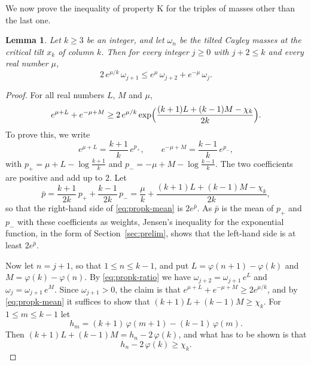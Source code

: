 \documentclass{amsart}
\newtheorem{lemma}[theorem]{Lemma}
\theoremstyle{definition}
\theoremstyle{remark}
\numberwithin{equation}{section}
\begin{document}
We now prove the inequality of property K for the triples of
masses other than the last one.

\begin{lemma}\label{lem:massesmiddle}
Let $k\ge3$ be an integer, and let $\omega_n$ be the tilted Cayley masses
at the critical tilt $x_k$ of column $k$. Then for every integer $j\ge0$
with $j+2\le k$ and every real number $\mu$,
\[
2\,e^{\mu/k}\,\omega_{j+1}\le e^{\mu}\,\omega_{j+2}+e^{-\mu}\,\omega_j .
\]
\end{lemma}

\begin{proof}
For all real numbers $L$, $M$ and $\mu$,
\begin{equation}\label{eq:propk-mean}
e^{\mu+L}+e^{-\mu+M}\ge
2\,e^{\mu/k}\exp\Bigl(\frac{(k+1)L+(k-1)M-\chi_k}{2k}\Bigr).
\end{equation}
To prove this, we write
\[
e^{\mu+L}=\frac{k+1}{k}\,e^{p_+},\qquad
e^{-\mu+M}=\frac{k-1}{k}\,e^{p_-},
\]
with $p_+=\mu+L-\log\frac{k+1}{k}$ and $p_-=-\mu+M-\log\frac{k-1}{k}$. The
two coefficients are positive and add up to $2$. Let
\[
\bar p=\frac{k+1}{2k}\,p_++\frac{k-1}{2k}\,p_-
=\frac{\mu}{k}+\frac{(k+1)L+(k-1)M-\chi_k}{2k} ,
\]
so that the right-hand side of \eqref{eq:propk-mean} is $2e^{\bar p}$. As
$\bar p$ is the mean of $p_+$ and $p_-$ with these coefficients as weights,
Jensen's inequality for the exponential function, in the form of
Section~\ref{sec:prelim}, shows that the left-hand side is at least
$2e^{\bar p}$.

Now let $n=j+1$, so that $1\le n\le k-1$, and put
$L=\varphi(n+1)-\varphi(k)$ and $M=\varphi(k)-\varphi(n)$. By
\eqref{eq:propk-ratio} we have $\omega_{j+2}=\omega_{j+1}\,e^{L}$ and
$\omega_j=\omega_{j+1}\,e^{M}$. Since $\omega_{j+1}>0$, the claim is that
$e^{\mu+L}+e^{-\mu+M}\ge2e^{\mu/k}$, and by \eqref{eq:propk-mean} it
suffices to show that $(k+1)L+(k-1)M\ge\chi_k$. For $1\le m\le k-1$ let
\[
h_m=(k+1)\,\varphi(m+1)-(k-1)\,\varphi(m).
\]
Then $(k+1)L+(k-1)M=h_n-2\,\varphi(k)$, and what has to be shown is that
\begin{equation}\label{eq:propk-exponent}
h_n-2\,\varphi(k)\ge\chi_k .
\end{equation}


\end{proof}
\end{document}
